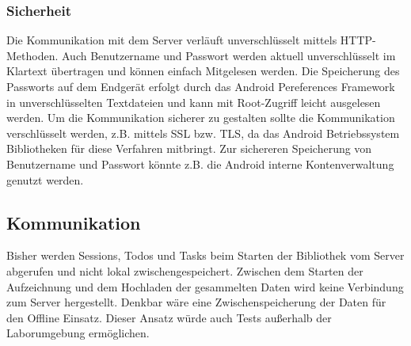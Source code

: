 \subsubsection{Sicherheit}
Die Kommunikation mit dem Server verläuft unverschlüsselt mittels \ac{HTTP}-Methoden.
Auch Benutzername und Passwort werden aktuell unverschlüsselt im Klartext übertragen und können einfach Mitgelesen werden.
Die Speicherung des Passworts auf dem Endgerät erfolgt durch das Android Pereferences Framework in unverschlüsselten Textdateien und kann mit Root-Zugriff leicht ausgelesen werden.  
Um die Kommunikation sicherer zu gestalten sollte die Kommunikation verschlüsselt werden, z.B. mittels \ac{SSL} bzw. \ac{TLS}, da das Android Betriebssystem Bibliotheken für diese Verfahren mitbringt.
Zur sichereren Speicherung von Benutzername und Passwort könnte z.B. die Android interne Kontenverwaltung genutzt werden.

\subsection{Kommunikation}
Bisher werden Sessions, Todos und Tasks beim Starten der Bibliothek vom Server abgerufen und nicht lokal zwischengespeichert. 
Zwischen dem Starten der Aufzeichnung und dem Hochladen der gesammelten Daten wird keine Verbindung zum Server hergestellt.
Denkbar wäre eine Zwischenspeicherung der Daten für den Offline Einsatz.
Dieser Ansatz würde auch Tests außerhalb der Laborumgebung ermöglichen.
